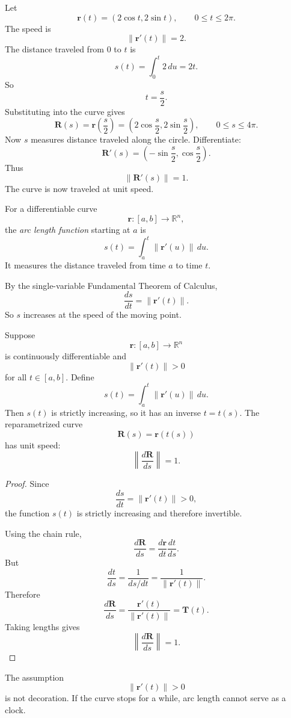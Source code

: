 Let
\[
    \mathbf r(t)=(2\cos t,2\sin t),
    \qquad 0\le t\le2\pi.
\]
The speed is
\[
    \|\mathbf r'(t)\|=2.
\]
The distance traveled from \(0\) to \(t\) is
\[
    s(t)=\int_0^t 2\,du=2t.
\]
So
\[
    t=\frac{s}{2}.
\]
Substituting into the curve gives
\[
    \mathbf R(s)=\mathbf r\left(\frac{s}{2}\right)
    =
    \left(2\cos\frac{s}{2},2\sin\frac{s}{2}\right),
    \qquad 0\le s\le4\pi.
\]
Now \(s\) measures distance traveled along the circle.  Differentiate:
\[
    \mathbf R'(s)=
    \left(
        -\sin\frac{s}{2},
        \cos\frac{s}{2}
    \right).
\]
Thus
\[
    \|\mathbf R'(s)\|=1.
\]
The curve is now traveled at unit speed.

\begin{definition}
For a differentiable curve
\[
    \mathbf r:[a,b]\to\mathbb R^n,
\]
the \emph{arc length function} starting at \(a\) is
\[
\boxed{
    s(t)=\int_a^t \|\mathbf r'(u)\|\,du.
}
\]
It measures the distance traveled from time \(a\) to time \(t\).
\end{definition}

By the single-variable Fundamental Theorem of Calculus,
\[
    \frac{ds}{dt}=\|\mathbf r'(t)\|.
\]
So \(s\) increases at the speed of the moving point.

\begin{theorem}
Suppose
\[
    \mathbf r:[a,b]\to\mathbb R^n
\]
is continuously differentiable and
\[
    \|\mathbf r'(t)\|>0
\]
for all \(t\in[a,b]\).  Define
\[
    s(t)=\int_a^t \|\mathbf r'(u)\|\,du.
\]
Then \(s(t)\) is strictly increasing, so it has an inverse \(t=t(s)\).  The
reparametrized curve
\[
    \mathbf R(s)=\mathbf r(t(s))
\]
has unit speed:
\[
\boxed{
    \left\|\frac{d\mathbf R}{ds}\right\|=1.
}
\]
\end{theorem}

\begin{proof}
Since
\[
    \frac{ds}{dt}=\|\mathbf r'(t)\|>0,
\]
the function \(s(t)\) is strictly increasing and therefore invertible.

Using the chain rule,
\[
    \frac{d\mathbf R}{ds}
    =
    \frac{d\mathbf r}{dt}\frac{dt}{ds}.
\]
But
\[
    \frac{dt}{ds}
    =
    \frac{1}{ds/dt}
    =
    \frac{1}{\|\mathbf r'(t)\|}.
\]
Therefore
\[
    \frac{d\mathbf R}{ds}
    =
    \frac{\mathbf r'(t)}{\|\mathbf r'(t)\|}
    =
    \mathbf T(t).
\]
Taking lengths gives
\[
    \left\|\frac{d\mathbf R}{ds}\right\|=1.
\]
\end{proof}

The assumption
\[
    \|\mathbf r'(t)\|>0
\]
is not decoration.  If the curve stops for a while, arc length cannot serve as a clock.


